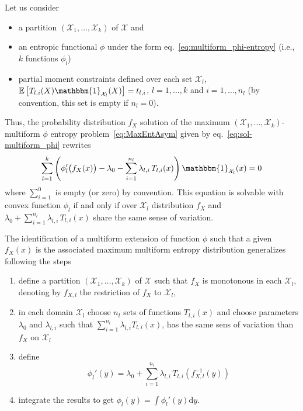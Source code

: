 \documentclass[english]{elsarticle}
\theoremstyle{definition}
\theoremstyle{plain}
\theoremstyle{plain}
\def\d{\mathrm{d}}
\def\X{\mathcal{X}}
\def\un{\mathbbm{1}}
\newcommand{\Esp}[1]{\mathbb{E}\left[ #1 \right]}
\begin{document}
Let us consider 
\begin{itemize}
\item a partition $(\X_1,\ldots,\X_k)$ of $\X$ and 
\item     an      entropic     functional     $\phi$      under     the     form
  eq.~\eqref{eq:multiform_phi-entropy} (i.e., $k$ functions $\phi_l$)
\item partial moment constraints  defined over each set $\X_l$, $\Esp{T_{l,i}(X)
    \un_{\X_{l}}(X)} = t_{l,i}$, $l = 1 , \ldots , k$ and $i = 1 , \ldots , n_l$
  (by convention, this set is empty if $n_l = 0$).
\end{itemize}
Thus,   the   probability   distribution   $f_X$   solution   of   the   maximum
$(\X_1,\ldots,\X_k)$-multiform   $\phi$   entropy  problem~\eqref{eq:MaxEntAsym}
given by eq.~\eqref{eq:sol-multiform_phi} rewrites
\begin{equation}\label{eq:sol-multiform_phi_concave}
\sum_{l=1}^k \left( \phi_l'\big(f_{X}(x)\big) - \lambda_0 - \sum_{i=1}^{n_l}
\lambda_{l,i}\, T_{l,i}(x) \right) \un_{\X_{l}}(x) = 0
\end{equation}
where  $\displaystyle  \sum_{i=1}^0$ is  empty  (or  zero)  by convention.  This
equation is  solvable with convex function  $\phi_l$ if and only  if over $\X_l$
distribution   $f_X$    and   $\displaystyle   \lambda_0    +   \sum_{i=1}^{n_l}
\lambda_{l,i}\, T_{l,i}(x)$ share the same sense of variation.

The identification of a multiform extension of function $\phi$ such that a given
$f_X(x)$ is  the associated  maximum multiform entropy  distribution generalizes
following the steps
\begin{enumerate}
\item define  a partition $(\X_1 ,  \ldots , \X_k)$  of $\X$ such that  $f_X$ is
  monotonous in each  $\X_l$, denoting by $f_{X,l}$ the  restriction of $f_X$ to
  $\X_l$,
\item  in each domain  $\X_l$ choose  $n_l$ sets  of functions  $T_{l,i}(x)$ and
  choose  parameters $\lambda_0$  and $\lambda_{l,i}$  such  that $\displaystyle
  \sum_{i=1}^{n_l} \lambda_{l,i}T_{l,i}(x)$, has the same sens of variation than
  $f_X$ on $\X_l$
\item define
\begin{equation}\label{eq:derivative-phil-concave}
\phi_l'(y) = \lambda_0 + \sum_{i=1}^{n_l} \lambda_{l,i} \,
T_{l,i}\!\left(f_{X,l}^{-1}(y)\right)
\end{equation}
\item integrate the  results to get ${\displaystyle \phi_l(y)  = \int \phi_l'(y)
    \d y}$.
\end{enumerate}
\end{document}

